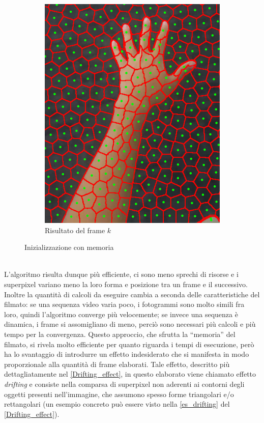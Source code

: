 \documentclass[12pt,a4paper,oneside]{article}
\begin{document}
\begin{figure}[!htb]
\begin{subfigure}[t]{.325\textwidth}
		\includegraphics[width=\textwidth]{resources/images/risultatoFrameAttuale_memory.png}
		\captionsetup{justification=centering}
		\caption{Risultato del frame $k$}
	\end{subfigure}%
	\caption{Inizializzazione con memoria}\label{es_init_memory}
\end{figure}
\\L'algoritmo risulta dunque più efficiente, ci sono meno sprechi di risorse e i superpixel variano meno la loro forma e posizione tra un frame e il successivo. Inoltre la quantità di calcoli da eseguire cambia a seconda delle caratteristiche del filmato: se una sequenza video varia poco, i fotogrammi sono molto simili fra loro, quindi l'algoritmo converge più velocemente; se invece una sequenza è dinamica, i frame si assomigliano di meno, perciò sono necessari più calcoli e più tempo per la convergenza. Questo approccio, che sfrutta la ``memoria'' del filmato, si rivela molto efficiente per quanto riguarda i tempi di esecuzione, però ha lo svantaggio di introdurre un effetto indesiderato che si manifesta in modo proporzionale alla quantità di frame elaborati. Tale effetto, descritto più dettagliatamente nel \cref{Drifting_effect}, in questo elaborato viene chiamato effetto \textit{drifting} e consiste nella comparsa di superpixel non aderenti ai contorni degli oggetti presenti nell'immagine, che assumono spesso forme triangolari e/o rettangolari (un esempio concreto può essere visto nella \cref{es_drifting} del \cref{Drifting_effect}).
\end{document}
